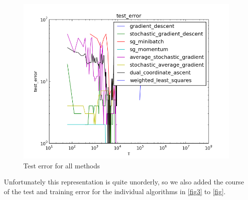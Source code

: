 \documentclass{article}
\begin{document}
\begin{figure}[h]
	\centering
	\includegraphics[width = .8\textwidth]{../results/test_error.png}
	\caption{Test error for all methods}
	\label{fig2}
\end{figure}

\FloatBarrier

Unfortunately this representation is quite unorderly, so we also added the course of the test and training error for the individual algorithms in \autoref{fig3} to \autoref{fig}.
\end{document}
